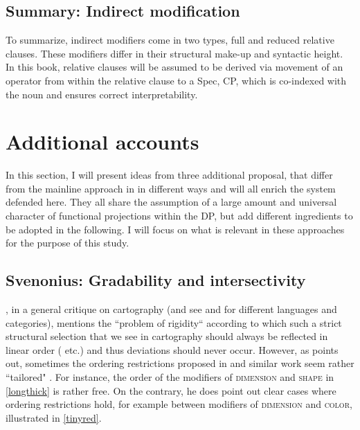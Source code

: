 \documentclass [output=book,colorlinks,citecolor=brown]{langscibook}
\begin{document}
\subsection{Summary: Indirect modification}

To summarize, indirect modifiers come in two types, full and reduced relative clauses. These modifiers differ in their structural make-up and syntactic height. In this book, relative clauses will be assumed to be derived via movement of an operator from within the relative clause to a Spec, CP, which is co-indexed with the noun and ensures correct interpretability.

\section{Additional accounts}

In this section, I will present ideas from three additional proposal, that differ from the mainline approach in \citet{cinque:2005:deriving, cinque:2017:micro, cinque:2010:adj, cinque:2020:relcl} in different ways and will all enrich the system defended here. They all share the assumption of a large amount and universal character of functional projections within the DP, but add different ingredients to be adopted in the following. I will focus on what is relevant in these approaches for the purpose of this study.

\subsection{Svenonius: Gradability and intersectivity} \label{svenonius}

\citet[249–250]{larson:2021:rethinking}, in a general critique on cartography (and see \citealt{truswell:2004:attributive, truswell:2009:attributive, svenonius:2008:position, kotowski:2016:adj} and \citealt{kim:2019:syntax} for different languages and categories), mentions the ``problem of rigidity“ according to which such a strict structural selection that we see in cartography should always be reflected in linear order (\citealt{kayne:1994:anti, cinque:2010:adj} etc.) and thus deviations should never occur. However, as \citet{svenonius:2008:position} points out, sometimes the ordering restrictions proposed in \citet{scott:2002:stacked} and similar work seem rather ``tailored" \citep[37]{svenonius:2008:position}. For instance, the order of the modifiers of \textsc{dimension} and \textsc{shape} in \ref{longthick} is rather free. On the contrary, he does point out clear cases where ordering restrictions hold, for example between modifiers of \textsc{dimension} and \textsc{color}, illustrated in \ref{tinyred}. %
\end{document}
